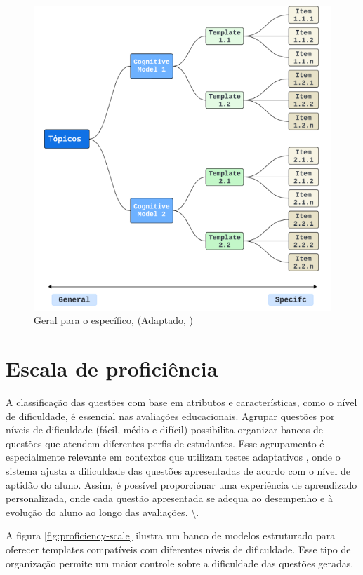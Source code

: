 \begin{figure}[ht]
	\centering
	\includegraphics[width=14cm]{./imagens/capitulo5/geral-especifico-com-topicos}
	\caption{Geral para o específico, (Adaptado, \cite{hendrickson2010}) }
	\label{fig:geral-to-specif}
\end{figure}


\section{Escala de proficiência}

A classificação das questões com base em atributos e características, como o nível de dificuldade, é essencial nas avaliações educacionais. Agrupar questões por níveis de dificuldade (fácil, médio e difícil) possibilita organizar bancos de questões que atendem diferentes perfis de estudantes.  Esse agrupamento é especialmente relevante em contextos que utilizam testes adaptativos , onde o sistema ajusta a dificuldade das questões apresentadas de acordo com o nível de aptidão do aluno. Assim, é possível proporcionar uma experiência de aprendizado personalizada, onde cada questão apresentada se adequa ao desempenho e à evolução do aluno ao longo das avaliações. \textbackslash{}\parencite{pasquali2018}. 


A figura \ref{fig:proficiency-scale}  ilustra um banco de modelos estruturado para oferecer templates compatíveis com diferentes níveis de dificuldade. Esse tipo de organização permite um maior controle sobre a dificuldade das questões geradas.


